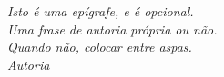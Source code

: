 \begin{epigrafe}
    \vspace*{\fill}
	\begin{flushright}
		\textit{Isto é uma epígrafe, e é opcional. \\
		Uma frase de autoria própria ou não.\\
		Quando não, colocar entre aspas.\\[2em]
		Autoria}
	\end{flushright}
\end{epigrafe}